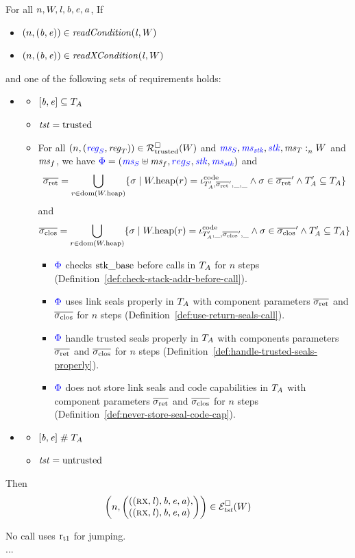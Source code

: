 \documentclass[a4paper]{article}
\begin{document}
\begin{theorem}[FTLR]
  \label{thm:ftlr}
  For all $n,W,\mathit{l},\mathit{b},\mathit{e},\mathit{a}$,
  If
  \begin{itemize}
  \item $\npair{(\baddr,\eaddr)} \in \readCond{\lin,W}$
  \item $\npair{(\baddr,\eaddr)} \in \xReadCond{\lin,W}$
  \end{itemize}
  and one of the following sets of requirements holds:
  \begin{itemize}
  \item \begin{itemize}
    \item $[\mathit{b},\mathit{e}] \subseteq T_A$
    \item $\mathit{tst} = \mathrm{trusted}$
    \item For all $\npair{\stpair{\reg}{\reg}} \in \lrrtrusted(W)$ and ${\color{blue} \mathit{ms}_S},{\color{blue} \mathit{ms}_{\mathit{stk}}},{\color{blue} \mathit{stk}},\mathit{ms}_T :_{n}^{}W$ and $\mathit{ms}_f$, we have ${\color{blue} \Phi} = ({\color{blue} \mathit{ms}_S} \uplus \mathit{ms}_f, {\color{blue} reg_S}, {\color{blue} \mathit{stk}}, {\color{blue} \mathit{ms}_{\mathit{stk}}})$ and 
      \[
        \sigrets = \bigcup_{r \in \dom(\pwheap)} \{\sigma \mid \pwheap(r) = \codereg{\ta',\sigrets',\_,\_} \wedge \sigma \in \sigrets'  \wedge \ta' \subseteq \ta\}
      \]
      and
      \[
        \sigcloss = \bigcup_{r \in \dom(\pwheap)} \{\sigma \mid \pwheap(r) = \codereg{\ta',\_,\sigcloss',\_} \wedge \sigma \in \sigcloss'  \wedge \ta' \subseteq \ta\}
      \]
      \begin{itemize}           
\item ${\color{blue} \Phi}$ checks $\mathrm{stk\_base}$ before calls in $T_A$ for $n$ steps (Definition~\ref{def:check-stack-addr-before-call}).
  \item ${\color{blue} \Phi}$ uses link seals properly in $T_A$ with component parameters $\sigrets$ and $\sigcloss$ for $n$ steps (Definition~\ref{def:use-return-seals-call}).
  \item ${\color{blue} \Phi}$ handle trusted seals properly in $T_A$ with components parameters $\sigrets$ and $\sigcloss$ for $n$ steps (Definition~\ref{def:handle-trusted-seals-properly}).
  \item ${\color{blue} \Phi}$ does not store link seals and code capabilities in $T_A$ with component parameters $\sigrets$ and $\sigcloss$ for $n$ steps (Definition~\ref{def:never-store-seal-code-cap}).
      \end{itemize}
    \end{itemize}
  \item
    \begin{itemize}
    \item $[\mathit{b},\mathit{e}] \mathrel{\#} T_A$
    \item $\mathit{tst} = \mathrm{untrusted}$
    \end{itemize}
  \end{itemize}
  Then
  \[
    \npair{\left(\arraycolsep=0pt\array{l}((\rx,\lin),\baddr,\eaddr,\aaddr),\\
      ((\rx,\lin),\baddr,\eaddr,\aaddr)\endarray\right)} \in \lreg{\trust}(W)
  \]
  \begin{definition}
    No call uses $\mathrm{r}_\mathrm{t1}$ for jumping.\\
    ...
  \end{definition}


\end{theorem}
\end{document}
